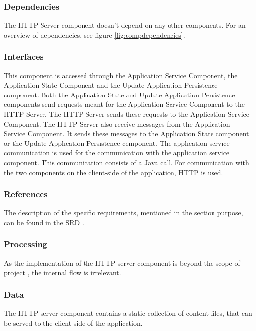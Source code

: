 \subsubsection*{Dependencies}
The HTTP Server component doesn't depend on any other components. For an overview of dependencies, see figure \ref{fig:compdependencies}.

\subsubsection*{Interfaces}
This component is accessed through the Application Service Component, the Application State Component and the Update Application Persistence component. Both the Application State and Update Application Persistence components send requests meant for the Application Service Component to the HTTP Server. The HTTP Server sends these requests to the Application Service Component. The HTTP Server also receive messages from the Application Service Component. It sends these messages to the Application State component or the Update Application Persistence component. The application service communication is used for the communication with the application service component. This communication consists of a Java call. For communication with the two components on the client-side of the application, HTTP is used.

\subsubsection*{References}
The description of the specific requirements, mentioned in the section purpose, can be found in the SRD \cite{srd}.

\subsubsection*{Processing}
As the implementation of the HTTP server component is beyond the scope of project \projectname, the internal flow is irrelevant.

\subsubsection*{Data}
The HTTP server component contains a static collection of content files, that can be served to the client side of the application.

